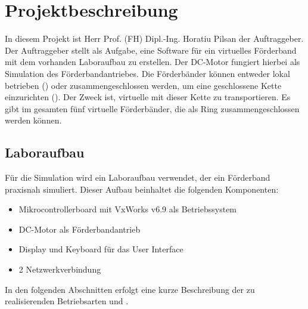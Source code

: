\documentclass[./\jobname.tex]{subfiles}
\begin{document}
%
%
\chapter{Projektbeschreibung}
%
In diesem Projekt ist Herr Prof. (FH) Dipl.-Ing. Horatiu Pilsan der Auftraggeber. Der Auftraggeber stellt als Aufgabe, eine Software für ein virtuelles Förderband mit dem vorhanden Laboraufbau zu erstellen. Der DC-Motor fungiert hierbei als Simulation des Förderbandantriebes. Die Förderbänder können entweder lokal betrieben (\modeA) oder zusammengeschlossen werden, um eine geschlossene Kette einzurichten (\modeB). Der Zweck ist, virtuelle  mit dieser Kette zu transportieren. Es gibt im gesamten fünf virtuelle Förderbänder, die als Ring zusammengeschlossen werden können.
%
\section{Laboraufbau}
%
Für die Simulation wird ein Laboraufbau verwendet, der ein Förderband praxisnah simuliert. Dieser Aufbau beinhaltet die folgenden Komponenten:
%
\begin{itemize}
\item Mikrocontrollerboard mit VxWorks v6.9 als Betriebssystem
\item DC-Motor als Förderbandantrieb
\item Display und Keyboard für das User Interface
\item 2 Netzwerkverbindung
\end{itemize}
%
In den folgenden Abschnitten erfolgt eine kurze Beschreibung der zu realisierenden Betriebsarten \modeA und \modeB.
%
\end{document}
